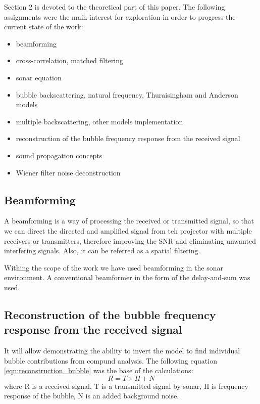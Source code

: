 Section 2 is devoted to the theoretical part of this paper. The following assignments were the main interest for exploration in order to progress the current state of the work:
\begin{itemize}
    \item beamforming
    \item cross-correlation, matched filtering
    \item sonar equation
    \item bubble backscattering, natural frequency, Thuraisingham and Anderson models
    \item multiple backscattering, other models implementation
    \item reconstruction of the bubble frequency response from the received signal
    \item sound propagation concepts
    \item Wiener filter noise deconstruction
\end{itemize}

\subsection{Beamforming}

A beamforming is a way of processing the received or transmitted signal, so that we can direct the directed and amplified signal from teh projector with multiple receivers or transmitters, therefore improving the SNR and eliminating unwanted interfering signals. Also, it can be referred as a spatial filtering.

Withing the scope of the work we have used beamforming in the sonar environment. A conventional beamformer in the form of the delay-and-sum was used. 

\subsection{Reconstruction of the bubble frequency response from the received signal}

It will allow demonstrating the ability to invert the model to find individual bubble contributions from compund analysis.
The following equation \ref*{eqn:reconstruction_bubble} was the base of the calculations:
\begin{equation}
    \label{eqn:reconstruction_bubble}
    R = T \times H + N
\end{equation}
where R is a received signal, T is a transmitted signal by sonar, H is frequency response of the bubble, N is an added background noise.


